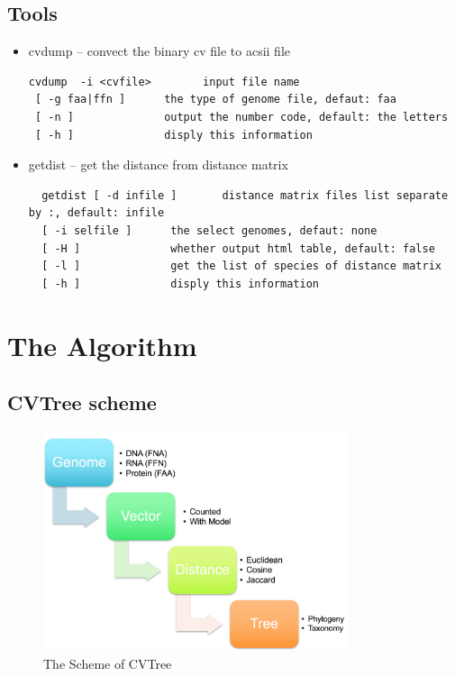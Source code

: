 \documentclass[a4paper,12pt]{article}
\begin{document}
\subsection{Tools}
\begin{itemize}
  \item cvdump -- convect the binary cv file to acsii file
\begin{verbatim}
cvdump  -i <cvfile>        input file name
 [ -g faa|ffn ]      the type of genome file, defaut: faa
 [ -n ]              output the number code, default: the letters
 [ -h ]              disply this information
\end{verbatim}

\item getdist -- get the distance from distance matrix
\begin{verbatim}
  getdist [ -d infile ]       distance matrix files list separate by :, default: infile
  [ -i selfile ]      the select genomes, defaut: none
  [ -H ]              whether output html table, default: false
  [ -l ]              get the list of species of distance matrix
  [ -h ]              disply this information
\end{verbatim}
\end{itemize}

\section{The Algorithm}
\subsection{CVTree scheme}
\begin{figure}[!h]
  \centering
  \includegraphics[width=0.8\textwidth]{Scheme.png}
  \caption{The Scheme of CVTree}
\end{figure}
\end{document}
